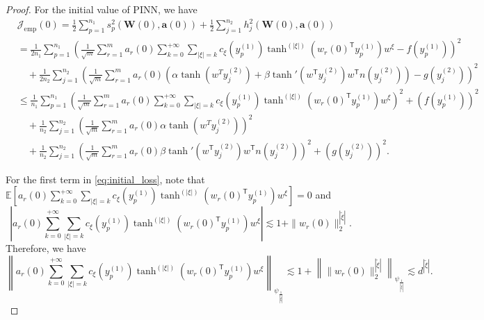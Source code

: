 \documentclass[10pt,a4paper]{amsart}
\newcommand{\T}{\mathsf{T}}
\begin{document}
\begin{proof}
	For the initial value of PINN, we have 
	\begin{equation}
		\begin{aligned}
			&\mathcal{J}_{\text{emp}}(0)=\frac{1}{2}\sum\limits_{p=1}^{n_1}s_p^2(\mathbf{W}(0), \mathbf{a}(0))+\frac{1}{2}\sum\limits_{j=1}^{n_2}h_j^2(\mathbf{W}(0), \mathbf{a}(0)) \\
			&= \frac{1}{2n_1}\sum\limits_{p=1}^{n_1} \left(\frac{1}{\sqrt{m}} \sum\limits_{r=1}^m a_r(0) \sum_{k=0}^{+\infty} \sum_{|\xi|=k} c_{\xi}(y_p^{(1)}) \tanh^{(|\xi|)}(w_r(0)^\T y_p^{(1)})w^{\xi}-f(y_p^{(1)}) \right)^2\\
			&\quad + \frac{1}{2n_2}\sum\limits_{j=1}^{n_2} \left(\frac{1}{\sqrt{m}} \sum\limits_{r=1}^m a_r(0)(\alpha \tanh(w^T y_{j}^{(2)})+\beta \tanh'(w^\T y_{j}^{(2)})w^\T n(y_{j}^{(2)}))-g(y_j^{(2)})\right)^2\\
			&\leq \frac{1}{n_1}\sum\limits_{p=1}^{n_1} \left(\frac{1}{\sqrt{m}} \sum\limits_{r=1}^m a_r(0) \sum_{k=0}^{+\infty} \sum_{|\xi|=k} c_{\xi}(y_p^{(1)}) \tanh^{(|\xi|)}(w_r(0)^\T y_p^{(1)})w^{\xi}\right)^2+(f(y_p^{(1)}) )^2\\
			&\quad + \frac{1}{n_2}\sum\limits_{j=1}^{n_2} \left(\frac{1}{\sqrt{m}} \sum\limits_{r=1}^m a_r(0)\alpha \tanh(w^T y_{j}^{(2)})\right)^2\\ 
            &\quad + \frac{1}{n_2}\sum\limits_{j=1}^{n_2} \left(\frac{1}{\sqrt{m}} \sum\limits_{r=1}^m a_r(0)\beta \tanh'(w^\T y_{j}^{(2)})w^\T n(y_{j}^{(2)})\right)^2+(g(y_j^{(2)}))^2.\label{eq:initial_loss}
		\end{aligned}
	\end{equation}

	For the first term in \cref{eq:initial_loss}, note that $\mathbb{E}\left[a_r(0)\sum_{k=0}^{+\infty} \sum_{|\xi|=k} c_{\xi}(y_p^{(1)}) \tanh^{(|\xi|)}(w_r(0)^\T y_p^{(1)})w^{\xi}\right]=0$ and
	\begin{equation*}
		\left|a_r(0)\sum_{k=0}^{+\infty} \sum_{|\xi|=k} c_{\xi}(y_p^{(1)}) \tanh^{(|\xi|)}(w_r(0)^\T y_p^{(1)})w^{\xi}\right|\lesssim 1+ \|w_r(0)\|_{2}^{|\tilde{\xi}|} .
	\end{equation*}
	Therefore, we have
	\begin{equation*}
         \left\|  a_r(0)\sum_{k=0}^{+\infty} \sum_{|\xi|=k} c_{\xi}(y_p^{(1)}) \tanh^{(|\xi|)}(w_r(0)^\T y_p^{(1)})w^{\xi} \right\|_{\psi_{\frac{1}{|\tilde{\xi}|}}}\lesssim 1+ \left\|\|w_r(0)\|_{2}^{|\tilde{\xi}|}\right\|_{\psi_{\frac{1}{|\tilde{\xi}|}}}\lesssim d^{|\tilde{\xi}|}.
    \end{equation*}


\end{proof}
\end{document}
